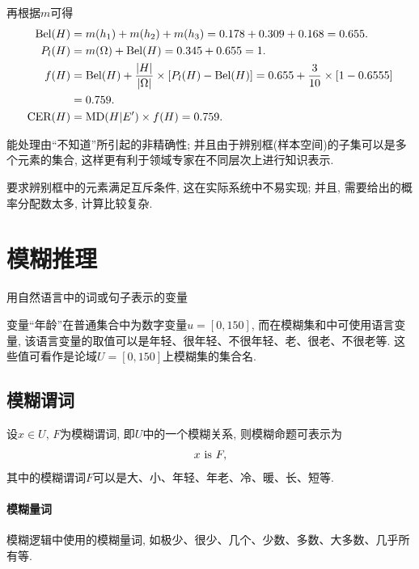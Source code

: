 再根据$m$可得
\begin{align*}
\textup{Bel}(H)&=m({h_1})+m({h_2})+m({h_3})=0.178+0.309+0.168=0.655.\\
  P_l(H)&=m(\Omega)+\textup{Bel}(H)=0.345+0.655=1.\\
  f(H) &=\textup{Bel}(H)+\frac{|H|}{|\Omega|} \times[P_l(H)-\textup{Bel}(H)]=0.655+\frac{3}{10} \times[1-0.6555] \\
       &=0.759.\\
  \textup{CER}(H)&=\textup{MD}(H|E')\times f(H)=0.759.
\end{align*}

\begin{tcolorbox}[title=\textbf{优点}]
    能处理由“不知道”所引起的非精确性; 并且由于辨别框(样本空间)的子集可以是多个元素的集合, 这样更有利于领域专家在不同层次上进行知识表示.
\end{tcolorbox}

\begin{tcolorbox}[title=\textbf{缺点}]
    要求辨别框中的元素满足互斥条件, 这在实际系统中不易实现; 并且, 需要给出的概率分配数太多, 计算比较复杂.
\end{tcolorbox}
\section{模糊推理}
用自然语言中的词或句子表示的变量
\begin{example}
变量“年龄”在普通集合中为数字变量$u=[0, 150]$, 而在模糊集和中可使用语言变量, 该语言变量的取值可以是年轻、很年轻、不很年轻、老、很老、不很老等. 这些值可看作是论域$U=[0, 150]$上模糊集的集合名.
\end{example}
\subsection{模糊谓词}
设$x\in U$, $F$为模糊谓词, 即$U$中的一个模糊关系, 则模糊命题可表示为
 \begin{align}
        x\,\,  \textup{is} \,\, F,
 \end{align}
其中的模糊谓词$F$可以是大、小、年轻、年老、冷、暖、长、短等.
\paragraph{模糊量词}
模糊逻辑中使用的模糊量词, 如极少、很少、几个、少数、多数、大多数、几乎所有等.


